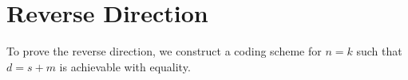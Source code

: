 \documentclass{report}
\theoremstyle{definition}
\begin{document}


    

\section{Reverse Direction}

To prove the reverse direction, we construct a coding scheme for $n = k$ such that $d = s + m$ is achievable with equality.


\end{document}
